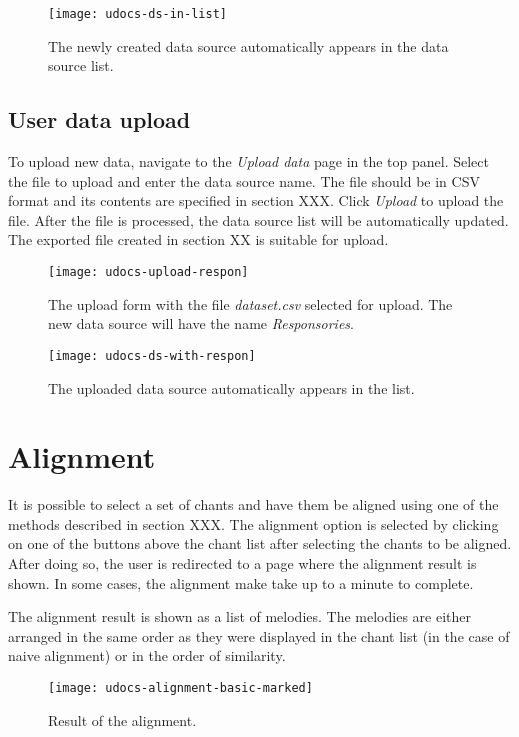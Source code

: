 \begin{figure}[h]
\centering
\texttt{[image: udocs-ds-in-list]}
\caption{The newly created data source automatically appears in the data source list.}
\label{fig:update-ds-antiphons}
\end{figure}

\subsection{User data upload}

To upload new data, navigate to the \emph{Upload data} page in the top panel. Select the file to upload and enter the data source name. The file should be
in CSV format and its contents are specified in section XXX. Click \emph{Upload} to upload the file. After the file is processed, the data source list will
be automatically updated. The exported file created in section XX is suitable for upload.

\begin{figure}[h]
\centering
\texttt{[image: udocs-upload-respon]}
\caption{The upload form with the file \emph{dataset.csv} selected for upload. The new data source will have the name \emph{Responsories}.}
\label{fig:upload-ds}
\end{figure}

\begin{figure}[h]
\centering
\texttt{[image: udocs-ds-with-respon]}
\caption{The uploaded data source automatically appears in the list.}
\label{fig:update-ds-respon}
\end{figure}

\section{Alignment}

It is possible to select a set of chants and have them be aligned using one of the methods described in section XXX. The alignment option is selected by clicking
on one of the buttons above the chant list after selecting the chants to be aligned. After doing so, the user is redirected to a page where the alignment result
is shown. In some cases, the alignment make take up to a minute to complete.

The alignment result is shown as a list of melodies. The melodies are either arranged in the same order as they were displayed in the chant list (in the case of
naive alignment) or in the order of similarity.

\begin{figure}[h]
\centering
\texttt{[image: udocs-alignment-basic-marked]}
\caption{Result of the alignment.}
\label{fig:align-result}
\end{figure}

